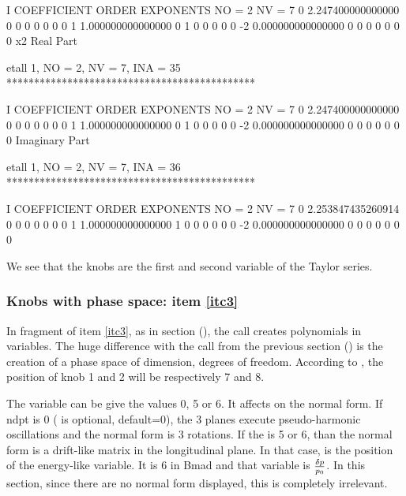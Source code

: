 \documentclass{hitec}     %
\begin{document}
{{{{{\begin{code}
    I  COEFFICIENT          ORDER   EXPONENTS
      NO =     2      NV =     7
   0   2.247400000000000       0  0  0  0  0  0  0
   1   1.000000000000000       0  1  0  0  0  0  0
    -2   0.000000000000000       0  0  0  0  0  0  0
  x2
  Real Part

 etall    1, NO =    2, NV =    7, INA =   35
 *********************************************

    I  COEFFICIENT          ORDER   EXPONENTS
      NO =     2      NV =     7
   0   2.247400000000000       0  0  0  0  0  0  0
   1   1.000000000000000       0  1  0  0  0  0  0
    -2   0.000000000000000       0  0  0  0  0  0  0
  Imaginary Part

 etall    1, NO =    2, NV =    7, INA =   36
 *********************************************

    I  COEFFICIENT          ORDER   EXPONENTS
      NO =     2      NV =     7
   0   2.253847435260914       0  0  0  0  0  0  0
   1   1.000000000000000       1  0  0  0  0  0  0
    -2   0.000000000000000       0  0  0  0  0  0  0
\end{code}
\renewcommand{\codefont}{\small}

We see that the knobs are the first and second variable of the Taylor series.

\subsubsection{Knobs with phase space: item \ref{itc3}}
\label{s:initwithps}

In fragment of item \ref{itc3},  as in section (), the call  creates polynomials in  variables. The huge difference with the call from the previous section () is the creation of a phase space of   dimension,   degrees of freedom.  According to , the position of knob 1 and 2 will be respectively 7 and 8.

The variable  can be give the values 0, 5 or 6. It affects on the normal form. If ndpt is 0 ( is optional, default=0), the 3 planes execute pseudo-harmonic oscillations and the normal form is 3 rotations. If the  is 5 or 6, than the normal form is a drift-like matrix in the longitudinal plane. In that case,  is the position of the energy-like variable. It is 6 in Bmad and that variable is $\delta p \over p_0$. In this section, since there are no normal form displayed, this is completely irrelevant. 

}}}}}
\end{document}
